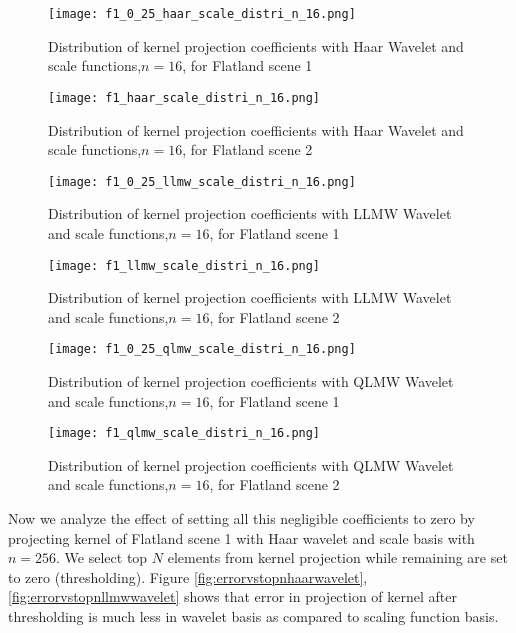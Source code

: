       









\begin{figure}[tbh]
\centering{}
\captionsetup{justification=centering}
\texttt{[image: f1\_0\_25\_haar\_scale\_distri\_n\_16.png]}
\caption{\label{fig:f1_0_25_haar_scale_distri_n_16}Distribution of kernel projection coefficients with Haar Wavelet and scale functions,$n=16$, for Flatland scene 1}
\end{figure}

\begin{figure}[tbh]
\centering{}
\captionsetup{justification=centering}
\texttt{[image: f1\_haar\_scale\_distri\_n\_16.png]}
\caption{\label{fig:f1_haar_scale_distri_n_16}Distribution of kernel projection coefficients with Haar Wavelet and scale functions,$n=16$, for  Flatland scene 2}
\end{figure}

\begin{figure}[tbh]
\centering{}
\captionsetup{justification=centering}
\texttt{[image: f1\_0\_25\_llmw\_scale\_distri\_n\_16.png]}
\caption{\label{fig:f1_0_25_llmw_scale_distri_n_16}Distribution of kernel projection coefficients with LLMW Wavelet and scale functions,$n=16$, for Flatland scene 1}
\end{figure}

\begin{figure}[tbh]
\centering{}
\captionsetup{justification=centering}
\texttt{[image: f1\_llmw\_scale\_distri\_n\_16.png]}
\caption{\label{fig:f1_llmw_scale_distri_n_16}Distribution of kernel projection coefficients with LLMW Wavelet and scale functions,$n=16$, for  Flatland scene 2}
\end{figure}

\begin{figure}[tbh]
\centering{}
\captionsetup{justification=centering}
\texttt{[image: f1\_0\_25\_qlmw\_scale\_distri\_n\_16.png]}
\caption{\label{fig:f1_0_25_qlmw_scale_distri_n_16}Distribution of kernel projection coefficients with QLMW Wavelet and scale functions,$n=16$, for Flatland scene 1}
\end{figure}

\begin{figure}[tbh]
\centering{}
\captionsetup{justification=centering}
\texttt{[image: f1\_qlmw\_scale\_distri\_n\_16.png]}
\caption{\label{fig:f1_qlmw_scale_distri_n_16}Distribution of kernel projection coefficients with QLMW Wavelet and scale functions,$n=16$, for  Flatland scene 2}
\end{figure}
Now we analyze the effect of setting all this negligible coefficients to zero by projecting kernel of Flatland scene 1 with Haar wavelet and scale basis with $n=256$. We select top $N$ elements from kernel projection while remaining are set to zero (thresholding). Figure \ref{fig:errorvstopnhaarwavelet}, \ref{fig:errorvstopnllmwwavelet} shows that error in projection of kernel after thresholding is much less in wavelet basis as compared to scaling function basis.


